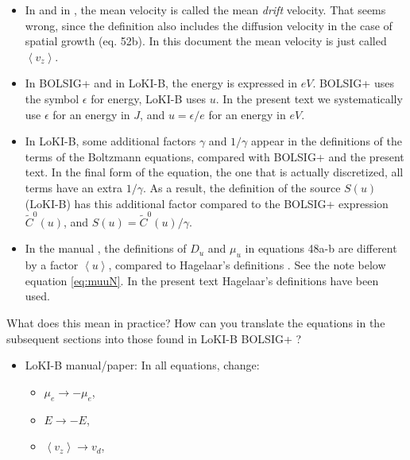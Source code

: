 \documentclass{book}
\newcommand{\MEAN}[1]{\ensuremath{\!\left\langle{{#1}}\right\rangle}}
\begin{document}
\begin{framed}
\begin{itemize}
		Also LoKI-B defines $\alpha$ this way, see \cite[eq. 52b]{Manual_2_2_0}.
		But note that $\alpha$ will be {\em positive} for positive $E$
		in LoKI-B, because of the definition that $E=-E_z$.

		In BOLSIG+, we see $\alpha=-(\dd{n_e}/\dd{z})/n_e$ instead (equation
		\cite[16]{Hagelaar2005}). Also the mean velocity $w$ (BOLSIG+ notation)
		is defined with a minus sign (same equation).
	\item In \cite[52a--b]{Manual_2_2_0} and in \cite[20b]{Tejero2019}, the mean
		velocity is called the mean {\em drift} velocity. That seems wrong, since
		the definition also includes the diffusion velocity in the case
		of spatial growth (eq. 52b). In this document the mean velocity
		is just called $\MEAN{v_z}$.
	\item	In BOLSIG+ and in LoKI-B, the energy is expressed in $eV$. BOLSIG+
		uses the symbol $\epsilon$ for energy, LoKI-B uses $u$. In the present
		text we systematically use $\epsilon$ for an energy in $J$, and
		$u=\epsilon/e$ for an energy in $eV$.
	\item In LoKI-B, some additional factors $\gamma$ and $1/\gamma$ appear in
		the definitions of the terms of the Boltzmann equations, compared with
		BOLSIG+ and the present text. In the final form of the equation,
		the one that is actually discretized, all terms have an extra $1/\gamma$.
		As a result, the definition of the source $S(u)$ (LoKI-B) has this
		additional factor compared to the BOLSIG+ expression $\tilde{C}^0(u)$,
		and $S(u)=\tilde{C}^0(u)/\gamma$.
	\item In the manual \cite[eq. 48a-b]{Manual_2_2_0}, the definitions of $D_u$ and
		$\mu_u$ in equations 48a-b are different by a factor $\MEAN{u}$, compared
		to Hagelaar's definitions \cite[eq. 61,62]{Hagelaar2005}. See the note
		below equation \eqref{eq:muuN}. In the present text Hagelaar's definitions
		have been used.
\end{itemize}
What does this mean in practice? How can you translate the equations in the subsequent
sections into those found in LoKI-B \cite{Manual_2_2_0} BOLSIG+ \cite{Hagelaar2005}?
\begin{itemize}
	\item LoKI-B manual/paper: In all equations, change:
		\begin{itemize}
			\item $\mu_e\rightarrow -\mu_e$,
			\item $E\rightarrow -E$,
			\item $\MEAN{v_z}\rightarrow v_d$,

\end{itemize}
\end{itemize}
\end{framed}
\end{document}

